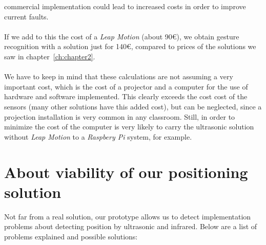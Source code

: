 commercial implementation could lead to increased costs in order to improve current faults.\\
\\
If we add to this the cost of a \textit {Leap Motion} (about 90\euro), we obtain 
gesture recognition with a solution just for 140\euro, compared to prices of the solutions we saw in chapter~\ref{ch:chapter2}.\\
\\
We have to keep in mind that these calculations are not assuming a very important cost, which is the cost of a projector and a computer for the
use of hardware and software implemented. This clearly exceeds the cost 
cost of the sensors (many other solutions have this added cost), but can be neglected, since a projection installation is very common in any classroom. Still, in order to minimize the cost of the computer is 
very likely to carry the ultrasonic solution without \textit{Leap Motion} to a \textit{Raspbery Pi} system, for example.

\section{About viability of our positioning solution}
\label{makereferenceE.2}
Not far from a real solution, our prototype allows us to detect implementation problems about detecting position by 
ultrasonic and infrared. Below are a list of problems 
explained and possible solutions:

